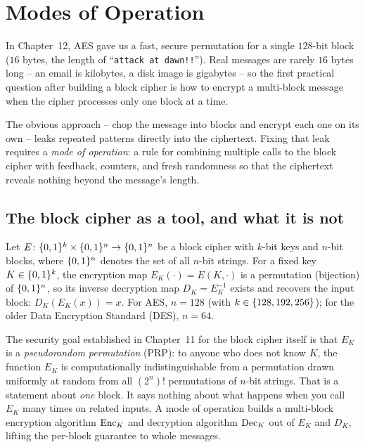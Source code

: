 \chapter{Modes of Operation}

In Chapter~12, AES gave us a fast, secure permutation for a single $128$-bit block ($16$ bytes, the length of ``\texttt{attack at dawn!!}''). Real messages are rarely $16$ bytes long -- an email is kilobytes, a disk image is gigabytes -- so the first practical question after building a block cipher is how to encrypt a multi-block message when the cipher processes only one block at a time.

The obvious approach -- chop the message into blocks and encrypt each one on its own -- leaks repeated patterns directly into the ciphertext. Fixing that leak requires a \emph{mode of operation}: a rule for combining multiple calls to the block cipher with feedback, counters, and fresh randomness so that the ciphertext reveals nothing beyond the message's length.

\chapterline

\section{The block cipher as a tool, and what it is not}

Let $E\colon \{0,1\}^k \times \{0,1\}^n \to \{0,1\}^n$ be a block cipher with $k$-bit keys and $n$-bit blocks, where $\{0,1\}^n$ denotes the set of all $n$-bit strings. For a fixed key $K \in \{0,1\}^k$, the encryption map $E_K(\cdot) = E(K,\cdot)$ is a permutation (bijection) of $\{0,1\}^n$, so its inverse decryption map $D_K = E_K^{-1}$ exists and recovers the input block: $D_K(E_K(x)) = x$. For AES, $n = 128$ (with $k \in \{128, 192, 256\}$); for the older Data Encryption Standard (DES), $n = 64$.

The security goal established in Chapter~11 for the block cipher itself is that $E_K$ is a \emph{pseudorandom permutation} (PRP): to anyone who does not know $K$, the function $E_K$ is computationally indistinguishable from a permutation drawn uniformly at random from all $(2^n)!$ permutations of $n$-bit strings. That is a statement about \emph{one} block. It says nothing about what happens when you call $E_K$ many times on related inputs. A mode of operation builds a multi-block encryption algorithm $\operatorname{Enc}_K$ and decryption algorithm $\operatorname{Dec}_K$ out of $E_K$ and $D_K$, lifting the per-block guarantee to whole messages.

